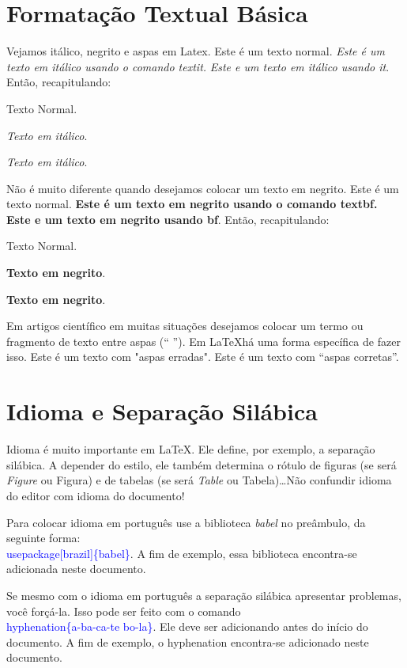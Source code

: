 \documentclass[12pt]{article}
\begin{document}
\section{Formatação Textual Básica}

Vejamos itálico, negrito e aspas em Latex. Este é um texto normal. \textit{Este é um texto em itálico usando o comando textit.} {\it Este e um texto em itálico usando it}. Então, recapitulando:

Texto Normal.

\textit{Texto em itálico}.

{\it Texto em itálico}.

Não é muito diferente quando desejamos colocar um texto em negrito. Este é um texto normal. \textbf{Este é um texto em negrito usando o comando textbf.} {\bf Este e um texto em negrito usando bf}. Então, recapitulando:

Texto Normal.

\textbf{Texto em negrito}.

{\bf Texto em negrito}.

Em artigos científico em muitas situações desejamos colocar um termo ou fragmento de texto entre aspas (`` ''). Em \LaTeX há uma forma específica de fazer isso. Este é um texto com "aspas erradas". Este é um texto com ``aspas corretas''.


\section{Idioma e Separação Silábica}

Idioma é muito importante em \LaTeX. Ele define, por exemplo, a separação silábica. A depender do estilo, ele também determina o rótulo de figuras (se será \textit{Figure} ou Figura) e de tabelas (se será \textit{Table} ou Tabela)\ldots  Não confundir idioma do editor com idioma do documento!

Para colocar idioma em português use a biblioteca \textit{babel} no preâmbulo, da seguinte forma:\textcolor{blue}{\\usepackage[brazil]\{babel\}}. A fim de exemplo, essa biblioteca encontra-se adicionada neste documento.

Se mesmo com o idioma em português a separação silábica apresentar problemas, você forçá-la. Isso pode ser feito com o comando \textcolor{blue}{\\hyphenation\{a-ba-ca-te bo-la\}}.  Ele deve ser adicionando antes do início do documento.  A fim de exemplo, o hyphenation encontra-se adicionado neste documento.
\end{document}
